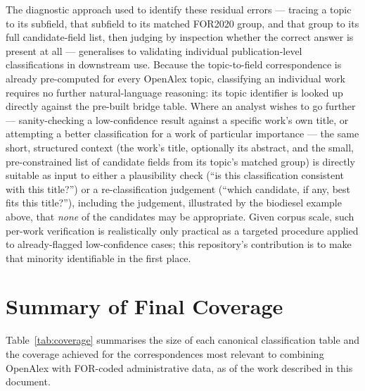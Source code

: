 \documentclass[11pt]{article}
\begin{document}
The diagnostic approach used to identify these residual errors --- tracing a topic to
its subfield, that subfield to its matched FOR2020 group, and that group to its full
candidate-field list, then judging by inspection whether the correct answer is present
at all --- generalises to validating individual publication-level classifications in
downstream use. Because the topic-to-field correspondence is already pre-computed for
every OpenAlex topic, classifying an individual work requires no further
natural-language reasoning: its topic identifier is looked up directly against the
pre-built bridge table. Where an analyst wishes to go further --- sanity-checking a
low-confidence result against a specific work's own title, or attempting a better
classification for a work of particular importance --- the same short, structured
context (the work's title, optionally its abstract, and the small, pre-constrained list
of candidate fields from its topic's matched group) is directly suitable as input to
either a plausibility check (``is this classification consistent with this title?'') or
a re-classification judgement (``which candidate, if any, best fits this title?''),
including the judgement, illustrated by the biodiesel example above, that \emph{none} of
the candidates may be appropriate. Given corpus scale, such per-work verification is
realistically only practical as a targeted procedure applied to already-flagged
low-confidence cases; this repository's contribution is to make that minority
identifiable in the first place.

\section{Summary of Final Coverage}
\label{sec:results}

Table~\ref{tab:coverage} summarises the size of each canonical classification table and
the coverage achieved for the correspondences most relevant to combining OpenAlex with
FOR-coded administrative data, as of the work described in this document.
\end{document}
